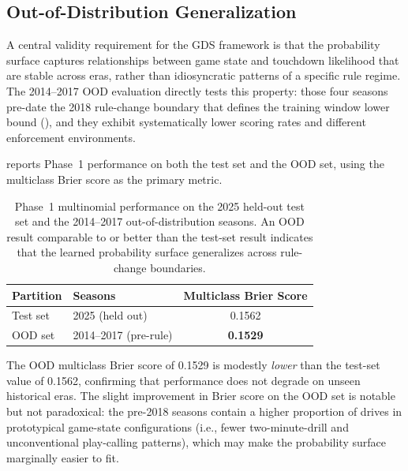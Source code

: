 \subsection{Out-of-Distribution Generalization}
\label{sec:ood-results}

A central validity requirement for the GDS framework is that the \xscore{}
probability surface captures relationships between game state and touchdown
likelihood that are stable across eras, rather than idiosyncratic patterns
of a specific rule regime. The 2014--2017 OOD evaluation directly tests this
property: those four seasons pre-date the 2018 rule-change boundary that
defines the training window lower bound (), and they exhibit
systematically lower scoring rates and different enforcement environments.

 reports Phase~1 performance on both the test set and
the OOD set, using the multiclass Brier score as the primary metric.

\begin{table}[htbp]
  \centering
  \caption{Phase~1 multinomial \xscore{} performance on the 2025 held-out
           test set and the 2014--2017 out-of-distribution seasons. An OOD
           result comparable to or better than the test-set result indicates
           that the learned probability surface generalizes across rule-change
           boundaries.}
  \label{tab:ood-results}
  \begin{tabularx}{\textwidth}{lXc}
    \toprule
    \textbf{Partition} & \textbf{Seasons}
      & \textbf{Multiclass Brier Score} \\
    \midrule
    Test set & 2025 (held out)       & 0.1562 \\
    OOD set  & 2014--2017 (pre-rule) & \textbf{0.1529} \\
    \bottomrule
  \end{tabularx}
\end{table}

The OOD multiclass Brier score of 0.1529 is modestly \emph{lower} than the
test-set value of 0.1562, confirming that performance does not degrade on
unseen historical eras. The slight improvement in Brier score on the OOD set
is notable but not paradoxical: the pre-2018 seasons contain a higher
proportion of drives in prototypical game-state configurations (i.e., fewer
two-minute-drill and unconventional play-calling patterns), which may make the
probability surface marginally easier to fit.

